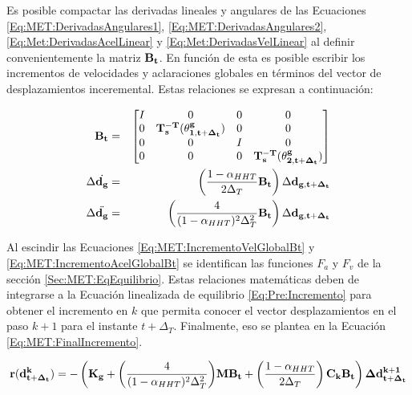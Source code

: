 Es posible compactar las derivadas lineales y angulares de las Ecuaciones \eqref{Eq:MET:DerivadasAngulares1}, \eqref{Eq:MET:DerivadasAngulares2}, \eqref{Eq:Met:DerivadasAcelLinear} y \eqref{Eq:Met:DerivadasVelLinear} al definir convenientemente la matriz $\bf{B_t}$. En función de esta es posible escribir los incrementos de velocidades y aclaraciones globales en términos del vector de desplazamientos inceremental. Estas relaciones se expresan a continuación:
	 
\begin{eqnarray}
	\label{Eq:MET:DefBt}
	\bf{B}_t & = & \bf{\begin{bmatrix}
			I& 0 & 0 & 0\\ 
			0 & \bf{T_s^{-T}}(\bf{\theta^g_{1,{t+\Delta_t}}}) & 0 & 0\\ 
			0& 0 & I & 0\\ 
			0 & 0 & 0 & \bf{T_s^{-T}}(\bf{\theta^g_{2,{t+\Delta_t}}})
	\end{bmatrix}}\\
	\label{Eq:MET:IncrementoVelGlobalBt}
	\Delta \dot{\bf{d_g}}&=& \left(\frac{1-\alpha_{HHT}}{2\Delta_T} \bf{B_t}\right) \Delta
	\bf{d_{g,{t+\Delta_t}}}\\
	\label{Eq:MET:IncrementoAcelGlobalBt}
	\Delta \ddot{\bf{d_g}}&=& \left( \frac{4}{(1-\alpha_{HHT})^2 \Delta_T^2} \bf{B_t} \right)\Delta
	\bf{d_{g,{t+\Delta_t}}}
\end{eqnarray}	



Al escindir las Ecuaciones \eqref{Eq:MET:IncrementoVelGlobalBt} y \eqref{Eq:MET:IncrementoAcelGlobalBt} se identifican las funciones $F_a$ y $F_v$ de la sección \ref{Sec:MET:EqEquilibrio}. Estas relaciones matemáticas deben de integrarse a la Ecuación linealizada de equilibrio \eqref{Eq:Pre:Incremento} para obtener el incremento en $k$ que permita conocer el vector desplazamientos en el paso $k+1$ para el instante $t+\Delta_T$. Finalmente, eso se plantea en la Ecuación \eqref{Eq:MET:FinalIncremento}.


\begin{equation}\label{Eq:MET:FinalIncremento}
	\bf{r}(\bf{d}^k_{t+\Delta_t})=  -\left
	(\bf{K}_g+\text{$\left( \frac{4}{(1-\alpha_{HHT})^2\Delta_T^2} \right)$} \bf{M}\bf{B}_t + \left(\text{$\frac{1-\alpha_{HHT}}{2\Delta_T}$}\right) \bf{C}_k \bf{B}_t \right)\Delta\bf{d}^{k+1}_{t+\Delta_t}
\end{equation}

